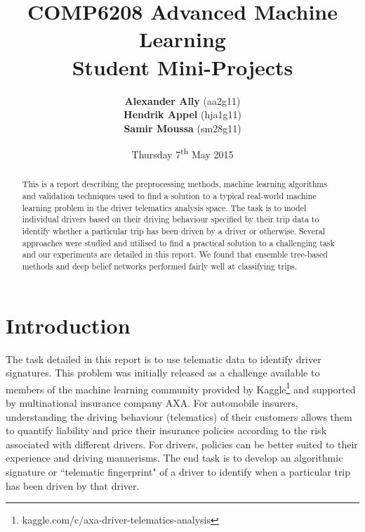 \documentclass[a4paper, 11pt, twocolumn]{report}
\begin{document}
\lstset{language=Matlab, basicstyle=\small}
\title{\textbf{COMP6208 Advanced Machine Learning} \\
{\Large Student Mini-Projects}}

\author{\textbf{Alexander Ally} (aa2g11)\\
\textbf{Hendrik Appel} (hja1g11)\\
\textbf{Samir Moussa} (sm28g11)}

\date{Thursday 7\textsuperscript{th} May 2015}
\maketitle

\begin{abstract}

This is a report describing the preprocessing methods, machine learning algorithms and validation techniques used to find a solution to a typical real-world machine learning problem in the driver telematics analysis space.
The task is to model individual drivers based on their driving behaviour specified by their trip data to identify whether a particular trip has been driven by a driver or otherwise.
Several approaches were studied and utilised to find a practical solution to a challenging task and our experiments are detailed in this report.
We found that ensemble tree-based methods and deep belief networks performed fairly well at classifying trips.

\end{abstract}


\section{Introduction}

The task detailed in this report is to use telematic data to identify driver signatures.
This problem was initially released as a challenge available to members of the machine learning community provided by Kaggle\footnote{kaggle.com/c/axa-driver-telematics-analysis} and supported by multinational insurance company AXA.
For automobile insurers, understanding the driving behaviour (telematics) of their customers allows them to quantify liability and price their insurance policies according to the risk associated with different drivers.
For drivers, policies can be better suited to their experience and driving mannerisms.
The end task is to develop an algorithmic signature or ``telematic fingerprint" of a driver to identify when a particular trip has been driven by that driver.
\end{document}
